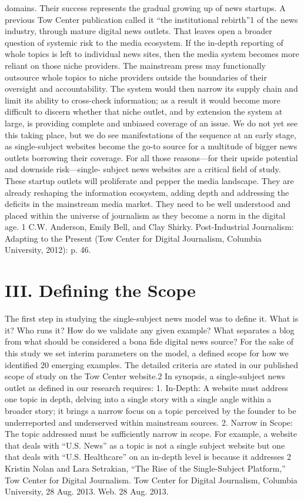 domains. Their success represents the gradual growing up of news startups.
A previous Tow Center publication called it ``the institutional rebirth''1 of
the news industry, through mature digital news outlets.
That leaves open a broader question of systemic risk to the media ecosystem.
If the in-depth reporting of whole topics is left to individual news sites,
then the media system becomes more reliant on those niche providers. The
mainstream press may functionally outsource whole topics to niche providers
outside the boundaries of their oversight and accountability. The system
would then narrow its supply chain and limit its ability to cross-check information;
as a result it would become more difficult to discern whether that
niche outlet, and by extension the system at large, is providing complete
and unbiased coverage of an issue. We do not yet see this taking place, but
we do see manifestations of the sequence at an early stage, as single-subject
websites become the go-to source for a multitude of bigger news outlets
borrowing their coverage.
For all those reasons—for their upside potential and downside risk—single-
subject news websites are a critical field of study. These startup outlets
will proliferate and pepper the media landscape. They are already reshaping
the information ecosystem, adding depth and addressing the deficits in the
mainstream media market. They need to be well understood and placed
within the universe of journalism as they become a norm in the digital age.
1 C.W. Anderson, Emily Bell, and Clay Shirky. Post-Industrial Journalism: Adapting to the Present
(Tow Center for Digital Journalism, Columbia University, 2012): p. 46.


\chapter{III. Defining the Scope}
The first step in studying the single-subject news model was to define
it. What is it? Who runs it? How do we validate any given example?
What separates a blog from what should be considered a bona fide digital
news source?
For the sake of this study we set interim parameters on the model, a defined
scope for how we identified 20 emerging examples. The detailed criteria are
stated in our published scope of study on the Tow Center website.2 In synopsis,
a single-subject news outlet as defined in our research requires:
1. In-Depth: A website must address one topic in depth, delving
into a single story with a single angle within a broader story; it
brings a narrow focus on a topic perceived by the founder to be
underreported and underserved within mainstream sources.
2. Narrow in Scope: The topic addressed must be sufficiently narrow
in scope. For example, a website that deals with ``U.S. News''
as a topic is not a single subject website but one that deals with
``U.S. Healthcare'' on an in-depth level is because it addresses
2 Kristin Nolan and Lara Setrakian, ``The Rise of the Single-Subject Platform,'' Tow Center for Digital
Journalism. Tow Center for Digital Journalism, Columbia University, 28 Aug. 2013. Web. 28 Aug. 2013.

